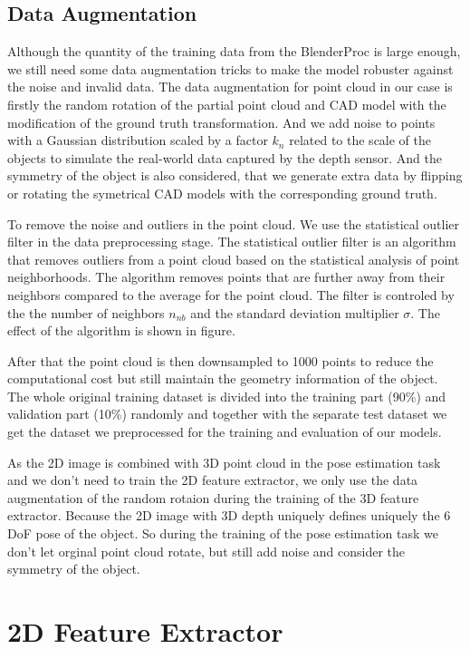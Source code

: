\documentclass[12pt,DIV14,BCOR12mm,a4paper,footinclude=false,headinclude,parskip=half-,twoside,openright,cleardoublepage=empty,toc=index,bibliography=totoc,listof=totoc]{scrreprt}
\numberwithin{equation}{chapter}
\begin{document}
\subsection{Data Augmentation}
Although the quantity of the training data from the BlenderProc is large enough, we still need some data augmentation tricks to make the model robuster against the noise and invalid data. The data augmentation for point cloud in our case is firstly the random rotation of the partial point cloud and CAD model with the modification of the ground truth transformation. And we add noise to points with a Gaussian distribution scaled by a factor $k_{n}$ related to the scale of the objects to simulate the real-world data captured by the depth sensor. And the symmetry of the object is also considered, that we generate extra data by flipping or rotating the symetrical CAD models with the corresponding ground truth. 

To remove the noise and outliers in the point cloud. We use the statistical outlier filter in the data preprocessing stage. The statistical outlier filter is an algorithm that removes outliers from a point cloud based on the statistical analysis of point neighborhoods. The algorithm removes points that are further away from their neighbors compared to the average for the point cloud. The filter is controled by the the number of neighbors $n_{nb}$ and the standard deviation multiplier $\sigma$. The effect of the algorithm is shown in figure.

After that the point cloud is then downsampled to 1000 points to reduce the computational cost but still maintain the geometry information of the object. The whole original training dataset is divided into the training part (90\%) and validation part (10\%) randomly and together with the separate test dataset we get the dataset we preprocessed for the training and evaluation of our models.

As the 2D image is combined with 3D point cloud in the pose estimation task and we don't need to train the 2D feature extractor, we only use the data augmentation of the random rotaion during the training of the 3D feature extractor. Because the 2D image with 3D depth uniquely defines uniquely the 6 DoF pose of the object. So during the training of the pose estimation task we don't let orginal point cloud rotate, but still add noise and consider the symmetry of the object.
\section{2D Feature Extractor}
\end{document}
